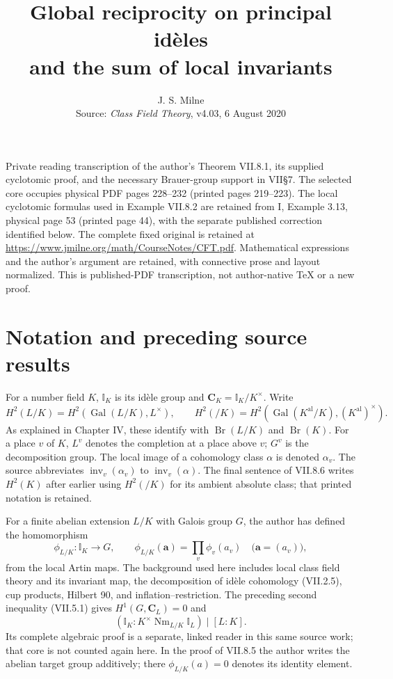 \documentclass[11pt]{article}
\title{Global reciprocity on principal id\`eles\\and the sum of local invariants}
\author{J. S. Milne\\\small Source: \emph{Class Field Theory}, v4.03, 6 August 2020}
\date{}
\newcommand{\I}{\mathbb I}
\newcommand{\C}{\mathbf C}
\newcommand{\Nm}{\operatorname{Nm}}
\newcommand{\Gal}{\operatorname{Gal}}
\newcommand{\Br}{\operatorname{Br}}
\newcommand{\inv}{\operatorname{inv}}
\begin{document}
\maketitle
\noindent\small
Private reading transcription of the author's Theorem VII.8.1, its supplied
cyclotomic proof, and the necessary Brauer-group support in VII\S7.
The selected core occupies physical PDF pages 228--232 (printed pages
219--223). The local cyclotomic formulas used in Example VII.8.2 are retained
from I, Example 3.13, physical page 53 (printed page 44), with the separate
published correction identified below. The complete fixed original is retained
at \url{https://www.jmilne.org/math/CourseNotes/CFT.pdf}.
Mathematical expressions and the author's argument are retained, with
connective prose and layout normalized. This is published-PDF transcription,
not author-native TeX or a new proof.
\normalsize

\section*{Notation and preceding source results}
For a number field $K$, $\I_K$ is its id\`ele group and
$\C_K=\I_K/K^\times$. Write
\[
 H^2(L/K)=H^2(\Gal(L/K),L^\times),\qquad
 H^2(/K)=H^2(\Gal(K^{\mathrm{al}}/K),(K^{\mathrm{al}})^\times).
\]
As explained in Chapter IV, these identify with $\Br(L/K)$ and $\Br(K)$.
For a place $v$ of $K$, $L^v$ denotes the completion at a place above $v$;
$G^v$ is the decomposition group. The local image of a cohomology class
$\alpha$ is denoted $\alpha_v$. The source abbreviates
$\inv_v(\alpha_v)$ to $\inv_v(\alpha)$.
The final sentence of VII.8.6 writes $H^2(K)$ after earlier using
$H^2(/K)$ for its ambient absolute class; that printed notation is retained.

For a finite abelian extension $L/K$ with Galois group $G$, the author has
defined the homomorphism
\[
 \phi_{L/K}:\I_K\longrightarrow G,\qquad
 \phi_{L/K}(\mathbf a)=\prod_v\phi_v(a_v)
 \quad\bigl(\mathbf a=(a_v)\bigr),
\]
from the local Artin maps. The background used here includes local class
field theory and its invariant map, the decomposition of id\`ele cohomology
(VII.2.5), cup products, Hilbert 90, and inflation--restriction.
The preceding second inequality (VII.5.1) gives $H^1(G,\C_L)=0$ and
\[
 (\I_K:K^\times\Nm_{L/K}\I_L)\mid[L:K].
\]
Its complete algebraic proof is a separate, linked reader in this same
source work; that core is not counted again here.
In the proof of VII.8.5 the author writes the abelian target group
additively; there $\phi_{L/K}(a)=0$ denotes its identity element.
\end{document}
